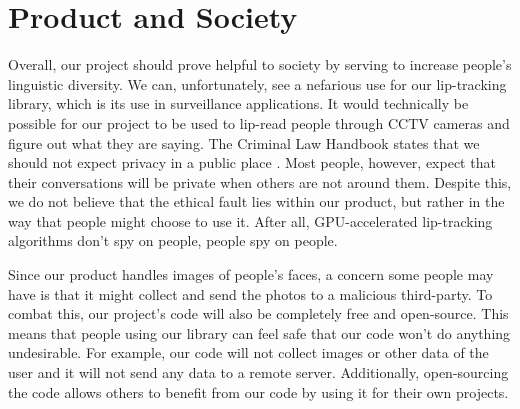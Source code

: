 \section{Product and Society}
Overall, our project should prove helpful to society by serving to increase people's linguistic diversity. We can, unfortunately, see a nefarious use for our lip-tracking library, which is its use in surveillance applications. It would technically be possible for our project to be used to lip-read people through CCTV cameras and figure out what they are saying. The Criminal Law Handbook states that we should not expect privacy in a public place \cite{criminal-law}. Most people, however, expect that their conversations will be private when others are not around them. Despite this, we do not believe that the ethical fault lies within our product, but rather in the way that people might choose to use it. After all, GPU-accelerated lip-tracking algorithms don't spy on people, people spy on people. 

Since our product handles images of people's faces, a concern some people may have is that it might collect and send the photos to a malicious third-party. To combat this, our project's code will also be completely free and open-source. This means that people using our library can feel safe that our code won't do anything undesirable. For example, our code will not collect images or other data of the user and it will not send any data to a remote server. Additionally, open-sourcing the code allows others to benefit from our code by using it for their own projects.
